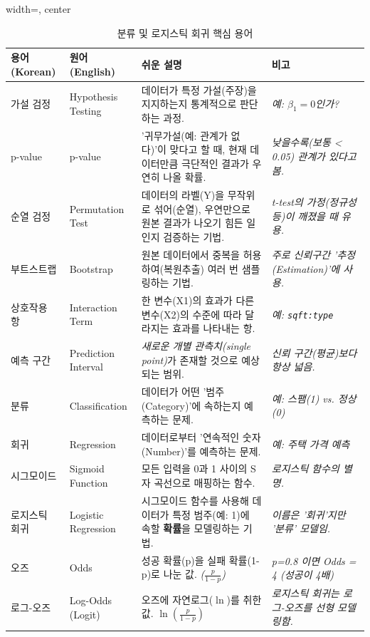 \documentclass[11pt,a4paper]{book}
\theoremstyle{definition}
\begin{document}
\begin{table}[h!]
  \centering
  \caption{분류 및 로지스틱 회귀 핵심 용어}
  \label{tab:terminology}
  \begin{adjustbox}{width=\textwidth, center}
  \begin{tabular}{@{}llll@{}}
    \toprule
    \textbf{용어 (Korean)} & \textbf{원어 (English)} & \textbf{쉬운 설명} & \textbf{비고} \\
    \midrule
    가설 검정 & Hypothesis Testing & 데이터가 특정 가설(주장)을 지지하는지 통계적으로 판단하는 과정. & \textit{예: $\beta_1 = 0$인가?} \\
    p-value & p-value & '귀무가설(예: 관계가 없다)'이 맞다고 할 때, 현재 데이터만큼 극단적인 결과가 우연히 나올 확률. & \textit{낮을수록(보통 < 0.05) 관계가 있다고 봄.} \\
    순열 검정 & Permutation Test & 데이터의 라벨(Y)을 무작위로 섞어(순열), 우연만으로 원본 결과가 나오기 힘든 일인지 검증하는 기법. & \textit{t-test의 가정(정규성 등)이 깨졌을 때 유용.} \\
    부트스트랩 & Bootstrap & 원본 데이터에서 중복을 허용하여(복원추출) 여러 번 샘플링하는 기법. & \textit{주로 신뢰구간 '추정(Estimation)'에 사용.} \\
    상호작용 항 & Interaction Term & 한 변수(X1)의 효과가 다른 변수(X2)의 수준에 따라 달라지는 효과를 나타내는 항. & \textit{예: \texttt{sqft:type}} \\
    예측 구간 & Prediction Interval & \textit{새로운 개별 관측치(single point)}가 존재할 것으로 예상되는 범위. & \textit{신뢰 구간(평균)보다 항상 넓음.} \\
    \midrule
    분류 & Classification & 데이터가 어떤 '범주(Category)'에 속하는지 예측하는 문제. & \textit{예: 스팸(1) vs. 정상(0)} \\
    회귀 & Regression & 데이터로부터 '연속적인 숫자(Number)'를 예측하는 문제. & \textit{예: 주택 가격 예측} \\
    시그모이드 & Sigmoid Function & 모든 입력을 0과 1 사이의 S자 곡선으로 매핑하는 함수. & \textit{로지스틱 함수의 별명.} \\
    로지스틱 회귀 & Logistic Regression & 시그모이드 함수를 사용해 데이터가 특정 범주(예: 1)에 속할 \textbf{확률}을 모델링하는 기법. & \textit{이름은 '회귀'지만 '분류' 모델임.} \\
    오즈 & Odds & 성공 확률(p)을 실패 확률(1-p)로 나눈 값. \textit{($\frac{p}{1-p}$)} & \textit{p=0.8 이면 Odds = 4 (성공이 4배)} \\
    로그-오즈 & Log-Odds (Logit) & 오즈에 자연로그($\ln$)를 취한 값. \textit{$\ln(\frac{p}{1-p})$} & \textit{로지스틱 회귀는 로그-오즈를 선형 모델링함.} \\

\end{tabular}
\end{adjustbox}
\end{table}
\end{document}
